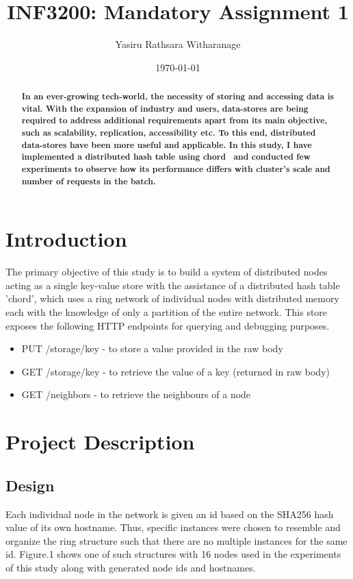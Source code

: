 \documentclass[
    a4paper,
    twocolumn,
]{article}
\title{INF3200: Mandatory Assignment 1}
\author{Yasiru Rathsara Witharanage}
\date{\today}
\begin{document}
\maketitle

\begin{abstract}
    \textbf{In an ever-growing tech-world, the necessity of storing and accessing data is vital. With the expansion of industry and users, data-stores are being required to address additional requirements apart from its main objective, such as scalability, replication, accessibility etc. To this end, distributed data-stores have been more useful and applicable. In this study, I have implemented a distributed hash table using chord~\cite{1} and conducted few experiments to observe how its performance differs with cluster's scale and number of requests in the batch.}
\end{abstract}

\section{Introduction}

The primary objective of this study is to build a system of distributed nodes acting as a single key-value store with the assistance of a distributed hash table 'chord', which uses a ring network of individual nodes with distributed memory each with the knowledge of only a partition of the entire network. This store exposes the following HTTP endpoints for querying and debugging purposes.

\begin{itemize}
	\item PUT /storage/key - to store a value provided in the raw body
	\item GET /storage/key - to retrieve the value of a key (returned in raw body)
	\item GET /neighbors - to retrieve the neighbours of a node
\end{itemize}

\section{Project Description}
\subsection{Design}

Each individual node in the network is given an id based on the SHA256 hash value of its own hostname. Thus, specific instances were chosen to resemble and organize the ring structure such that there are no multiple instances for the same id. Figure.1 shows one of such structures with 16 nodes used in the experiments of this study along with generated node ids and hostnames.
\end{document}
